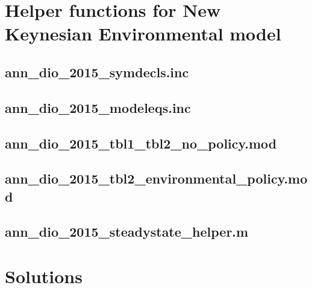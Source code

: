 \section{Helper functions for New Keynesian Environmental model}

\subsection{ann\_dio\_2015\_symdecls.inc\label{app:ann_dio_2015_symdecls}}


\subsection{ann\_dio\_2015\_modeleqs.inc\label{app:ann_dio_2015_modeleqs}}


\subsection{ann\_dio\_2015\_tbl1\_tbl2\_no\_policy.mod\label{app:ann_dio_2015_tbl1_tbl2_no_policy}}


\subsection{ann\_dio\_2015\_tbl2\_environmental\_policy.mod\label{app:ann_dio_2015_tbl2_environmental_policy}}


\subsection{ann\_dio\_2015\_steadystate\_helper.m\label{app:ann_dio_2015_steadystate_helper}}


\ifDisplaySolutions
\newpage
\appendix
\section{Solutions}

\fi
